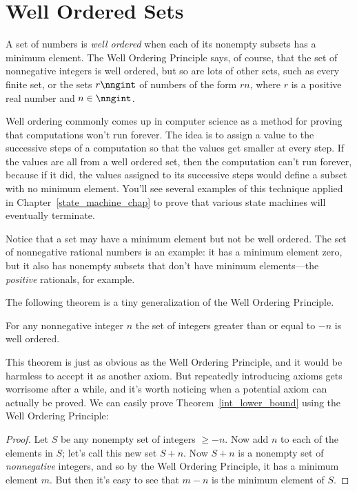 \section{Well Ordered Sets}\label{well_ordering_sec}

A set of numbers is \emph{well ordered}%
when each of its nonempty subsets has a minimum element.  The Well
Ordering Principle says, of course, that the set of nonnegative
integers is well ordered, but so are lots of other sets, such as every
finite set, or the sets $r\nngint$ of numbers of the form $rn$,
where $r$ is a positive real number and $n \in \nngint$.

Well ordering commonly comes up in computer science as a method for
proving that computations won't run forever.  The idea is to assign a
value to the successive steps of a computation so that the values get
smaller at every step.  If the values are all from a well ordered set,
then the computation can't run forever, because if it did, the values
assigned to its successive steps would define a subset with no minimum
element.  You'll see several examples of this technique applied in
Chapter~\ref{state_machine_chap} to prove that various state machines%
will eventually terminate.

Notice that a set may have a minimum element but not be well ordered.
The set of nonnegative rational numbers is an example: it has a
minimum element zero, but it also has nonempty subsets that
don't have minimum elements---the \emph{positive} rationals, for
example.

The following theorem is a tiny generalization of the Well Ordering
Principle.

\begin{theorem}\label{int_lower_bound}
For any nonnegative integer $n$ the set of integers greater than or
equal to $-n$ is well ordered.
\end{theorem}

This theorem is just as obvious as the Well Ordering Principle, and it
would be harmless to accept it as another axiom.  But repeatedly
introducing axioms gets worrisome after a while, and it's worth
noticing when a potential axiom can actually be proved.  We can easily
prove Theorem~\ref{int_lower_bound} using the Well Ordering Principle:

\begin{proof}
Let $S$ be any nonempty set of integers $\geq -n$.  Now add $n$ to
each of the elements in $S$; let's call this new set $S+n$.  Now $S+n$
is a nonempty set of \emph{nonnegative} integers, and so by the Well
Ordering Principle, it has a minimum element $m$.  But then it's easy
to see that $m - n$ is the minimum element of $S$.
\end{proof}

